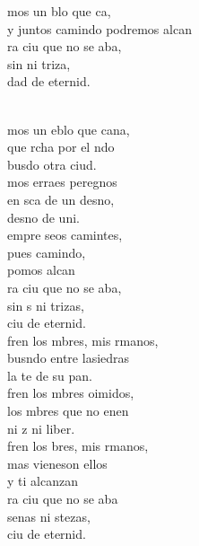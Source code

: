 \begin{cancion}%
	\begin{chorus}%
	mos un blo que ca,\\
	y juntos camindo podremos alcan\\
	ra ciu que no se aba,\\
	sin  ni triza,\\
	dad de eternid.\\
	\end{chorus}%
	\jump\\
	mos un eblo que cana,\\
	que rcha por el ndo\\
	busdo otra ciud.\\
	mos erraes peregnos\\
	en sca de un desno,\\
	desno de uni.\\
	empre seos camintes,\\
	pues  camindo,\\
	pomos alcan\\
	ra ciu que no se aba,\\
	sin s ni trizas,\\
	ciu de eternid.\\
	fren los mbres, mis rmanos,\\
	busndo entre lasiedras\\
	la te de su pan.\\
	fren los mbres oimidos,\\
	los mbres que no enen\\
	ni z ni liber.\\
	fren los bres, mis rmanos,\\
	mas vieneson ellos\\
	y ti alcanzan\\
	ra ciu que no se aba\\
	senas ni stezas,\\
	ciu de eternid.\\
\end{cancion}%
